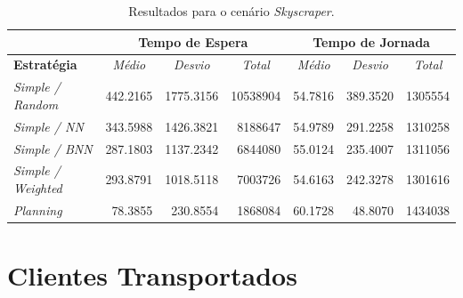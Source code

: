 \begin{table}[htb!]
\centering
\caption{Resultados para o cenário \textit{Skyscraper}.}
\label{tab:results:skyscraper}
\begin{tabular}{|l|r|r|r|r|r|r|}
\hline
\multicolumn{1}{|c|}{\textbf{}}                 & \multicolumn{3}{c|}{\textbf{Tempo de Espera}}                                                                    & \multicolumn{3}{c|}{\textbf{Tempo de Jornada}}                                                                                                                       \\ \hline
\textbf{Estratégia} & \multicolumn{1}{c|}{\textit{Médio}} & \multicolumn{1}{c|}{\textit{Desvio}} & \multicolumn{1}{c|}{\textit{Total}} & \multicolumn{1}{c|}{\textit{Médio}}                   & \multicolumn{1}{c|}{\textit{Desvio}}                  & \multicolumn{1}{c|}{\textit{Total}}                  \\ \hline
\textit{Simple / Random}          & 442.2165 & 1775.3156 & 10538904 & 54.7816 & 389.3520 & 1305554 \\ \hline
\textit{Simple / NN}              & 343.5988 & 1426.3821 &  8188647 & 54.9789 & 291.2258 & 1310258 \\ \hline
\textit{Simple / BNN}             & 287.1803 & 1137.2342 &  6844080 & 55.0124 & 235.4007 & 1311056 \\ \hline
\textit{Simple / Weighted}        & 293.8791 & 1018.5118 &  7003726 & \cellcolor[HTML]{67FD9A}54.6163 & 242.3278 & \cellcolor[HTML]{67FD9A}1301616 \\ \hline
\textit{Planning}                 &  \cellcolor[HTML]{67FD9A}78.3855 &  \cellcolor[HTML]{67FD9A}230.8554 &  \cellcolor[HTML]{67FD9A}1868084 & 60.1728 &  \cellcolor[HTML]{67FD9A}48.8070 & 1434038 \\ \hline
\end{tabular}
\end{table}

\section{Clientes Transportados}

